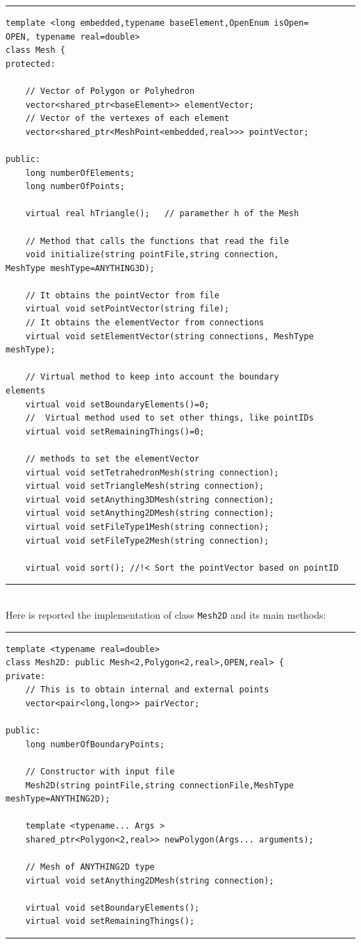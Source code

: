 \noindent\rule{12.7cm}{1pt}
\begin{lstlisting}[caption=File \texttt{Mesh.h}]
template <long embedded,typename baseElement,OpenEnum isOpen=
OPEN, typename real=double>
class Mesh {
protected:
    
    // Vector of Polygon or Polyhedron
    vector<shared_ptr<baseElement>> elementVector;	
    // Vector of the vertexes of each element
    vector<shared_ptr<MeshPoint<embedded,real>>> pointVector;	
	
public:
    long numberOfElements;
    long numberOfPoints;

    virtual real hTriangle();	// paramether h of the Mesh
	
    // Method that calls the functions that read the file
    void initialize(string pointFile,string connection,
MeshType meshType=ANYTHING3D);

    // It obtains the pointVector from file
    virtual void setPointVector(string file);	
    // It obtains the elementVector from connections
    virtual void setElementVector(string connections, MeshType
meshType);
    
    // Virtual method to keep into account the boundary 
elements
    virtual void setBoundaryElements()=0;
    //	Virtual method used to set other things, like pointIDs
    virtual void setRemainingThings()=0;

    // methods to set the elementVector
    virtual void setTetrahedronMesh(string connection); 
    virtual void setTriangleMesh(string connection);	
    virtual void setAnything3DMesh(string connection);
    virtual void setAnything2DMesh(string connection);
    virtual void setFileType1Mesh(string connection);
    virtual void setFileType2Mesh(string connection);

    virtual void sort(); //!< Sort the pointVector based on pointID
\end{lstlisting}

\noindent\rule{12.7cm}{1pt}\\

Here is reported the implementation of class \verb|Mesh2D| and its main methods:

\noindent\rule{12.7cm}{1pt}
\begin{lstlisting}[caption=File \texttt{Mesh2D.h}]
template <typename real=double>
class Mesh2D: public Mesh<2,Polygon<2,real>,OPEN,real> {
private:
    // This is to obtain internal and external points	
    vector<pair<long,long>> pairVector;

public:
    long numberOfBoundaryPoints;
	
    // Constructor with input file
    Mesh2D(string pointFile,string connectionFile,MeshType 
meshType=ANYTHING2D);

    template <typename... Args >
    shared_ptr<Polygon<2,real>> newPolygon(Args... arguments);

    // Mesh of ANYTHING2D type
    virtual void setAnything2DMesh(string connection);

    virtual void setBoundaryElements();
    virtual void setRemainingThings();
\end{lstlisting}
\noindent\rule{12.7cm}{1pt}\\

